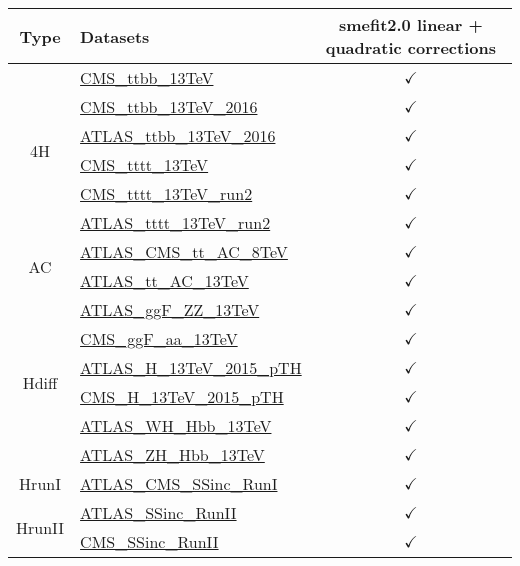 \documentclass{article}
\begin{document}
\begin{table}[H]
\footnotesize
\centering
\begin{tabular}{|c|l|c|}
\hline
 Type & Datasets  & smefit2.0 linear + quadratic corrections \\ \hline
\multirow{6}{*}{4H}
 & \href{https://arxiv.org/abs/1705.10141}{CMS_ttbb_13TeV}  & $\checkmark$\\ \cline{2-3}
 & \href{https://arxiv.org/abs/1909.05306}{CMS_ttbb_13TeV_2016}  & $\checkmark$\\ \cline{2-3}
 & \href{https://arxiv.org/abs/1811.12113}{ATLAS_ttbb_13TeV_2016}  & $\checkmark$\\ \cline{2-3}
 & \href{https://arxiv.org/abs/1710.10614}{CMS_tttt_13TeV}  & $\checkmark$\\ \cline{2-3}
 & \href{https://arxiv.org/abs/1908.06463}{CMS_tttt_13TeV_run2}  & $\checkmark$\\ \cline{2-3}
 & \href{https://arxiv.org/abs/2007.14858}{ATLAS_tttt_13TeV_run2}  & $\checkmark$
\\ \hline
\multirow{2}{*}{AC}
 & \href{https://arxiv.org/abs/1709.05327}{ATLAS_CMS_tt_AC_8TeV}  & $\checkmark$\\ \cline{2-3}
 & \href{https://cds.cern.ch/record/2682109}{ATLAS_tt_AC_13TeV}  & $\checkmark$
\\ \hline
\multirow{6}{*}{Hdiff}
 & \href{https://arxiv.org/abs/1909.02845}{ATLAS_ggF_ZZ_13TeV}  & $\checkmark$\\ \cline{2-3}
 & \href{https://inspirehep.net/literature/1725274}{CMS_ggF_aa_13TeV}  & $\checkmark$\\ \cline{2-3}
 & \href{https://inspirehep.net/literature/1743896}{ATLAS_H_13TeV_2015_pTH}  & $\checkmark$\\ \cline{2-3}
 & \href{https://arxiv.org/abs/1812.06504}{CMS_H_13TeV_2015_pTH}  & $\checkmark$\\ \cline{2-3}
 & \href{https://arxiv.org/abs/1903.04618}{ATLAS_WH_Hbb_13TeV}  & $\checkmark$\\ \cline{2-3}
 & \href{https://arxiv.org/abs/1903.04618}{ATLAS_ZH_Hbb_13TeV}  & $\checkmark$
\\ \hline
\multirow{1}{*}{HrunI}
 & \href{https://arxiv.org/abs/1606.02266}{ATLAS_CMS_SSinc_RunI}  & $\checkmark$
\\ \hline
\multirow{2}{*}{HrunII}
 & \href{https://arxiv.org/abs/1909.02845}{ATLAS_SSinc_RunII}  & $\checkmark$\\ \cline{2-3}
 & \href{https://arxiv.org/abs/1809.10733}{CMS_SSinc_RunII}  & $\checkmark$
\\ \hline

\end{tabular}
\end{table}
\end{document}
